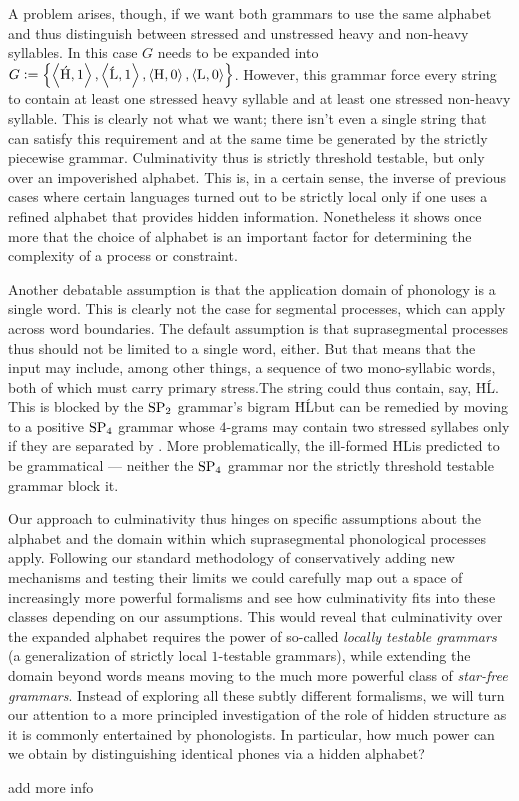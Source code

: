 A problem arises, though, if we want both grammars to use the same alphabet and thus distinguish between stressed and unstressed heavy and non-heavy syllables.
In this case $G$ needs to be expanded into
\(
    G \mathrel{\mathop:}= \left \{ 
        \left \langle \mathit{\text{\'H}},1 \right \rangle ,
        \left \langle \mathit{\text{\'L}},1 \right \rangle ,
        \left \langle \mathit{\text{H}},0 \right \rangle ,
        \left \langle \mathit{\text{L}},0 \right \rangle 
     \right \}
\).
However, this grammar force every string to contain at least one stressed heavy syllable and at least one stressed non-heavy syllable.
This is clearly not what we want;
there isn't even a single string that can satisfy this requirement and at the same time be generated by the strictly piecewise grammar.
Culminativity thus is strictly threshold testable, but only over an impoverished alphabet.
This is, in a certain sense, the inverse of previous cases where certain languages turned out to be strictly local only if one uses a refined alphabet that provides hidden information.
Nonetheless it shows once more that the choice of alphabet is an important factor for determining the complexity of a process or constraint.

Another debatable assumption is that the application domain of phonology is a single word.
This is clearly not the case for segmental processes, which can apply across word boundaries.
The default assumption is that suprasegmental processes thus should not be limited to a single word, either.
But that means that the input may include, among other things, a sequence of two mono-syllabic words, both of which must carry primary stress.The string could thus contain, say, \LeftEdge \'H\RightEdge\LeftEdge \'L\RightEdge.
This is blocked by the $\mathrm{SP}_2$ grammar's bigram \'H\'L\@ but can be remedied by moving to a positive $\mathrm{SP}_4$ grammar whose $4$-grams may contain two stressed syllabes only if they are separated by \RightEdge\LeftEdge.
More problematically, the ill-formed \LeftEdge \'H\RightEdge\LeftEdge L\RightEdge is predicted to be grammatical --- neither the $\mathrm{SP}_4$ grammar nor the strictly threshold testable grammar block it.

Our approach to culminativity thus hinges on specific assumptions about the alphabet and the domain within which suprasegmental phonological processes apply.
Following our standard methodology of conservatively adding new mechanisms and testing their limits we could carefully map out a space of increasingly more powerful formalisms and see how culminativity fits into these classes depending on our assumptions.
This would reveal that culminativity over the expanded alphabet requires the power of so-called \emph{locally testable grammars} (a generalization of strictly local $1$-testable grammars), while extending the domain beyond words means moving to the much more powerful class of \emph{star-free grammars}.
Instead of exploring all these subtly different formalisms, we will turn our attention to a more principled investigation of the role of hidden structure as it is commonly entertained by phonologists.
In particular, how much power can we obtain by distinguishing identical phones via a hidden alphabet?


\begin{literature}
add more info
\end{literature}
